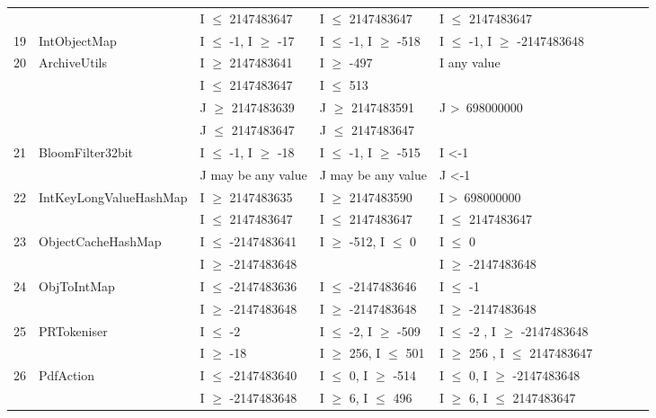 {\begin{longtable}{|l|l|l|l|l|l|l|l|l|}
	&                                             & I $\le$ 2147483647			& I $\le$ 2147483647			& I $\le$ 2147483647					\\	
19	& IntObjectMap				& I $\le$ -1, I $\ge$ -17			& I $\le$ -1, I $\ge$ -518			& I $\le$ -1, I $\ge$ -2147483648\\ 
20	& ArchiveUtils				& I $\ge$ 2147483641			& I $\ge$ -497					& I any value									\\ 
	&							& I $\le$ 2147483647			& I $\le$ 513					& 											\\ 
	&                                             & J $\ge$ 2147483639			& J $\ge$ 2147483591			& J \textgreater~698000000 	   				\\
	&                                             & J $\le$ 2147483647			&  J $\le$ 2147483647			&  	   										\\
21	& BloomFilter32bit 			& I $\le$ -1, I $\ge$ -18			& I $\le$ -1, I $\ge$ -515			& I \textless -1 								\\ 
	&                                             & J may be any value				& J may be any value				& J \textless -1 			   					\\	
22	& IntKeyLongValueHashMap	& I $\ge$ 2147483635			& I $\ge$ 2147483590			& I \textgreater~698000000					\\ 
	&                                             & I $\le$ 2147483647			& I $\le$ 2147483647			& I $\le$ 2147483647					\\	
23	& ObjectCacheHashMap		& I $\le$ -2147483641			& I $\ge$ -512, I $\le$ 0			& I $\le$ 0								\\ 
	&                                             & I $\ge$ -2147483648			& 								& I $\ge$ -2147483648				\\	
24	& ObjToIntMap				& I $\le$ -2147483636			& I $\le$ -2147483646			& I $\le$ -1								\\ 
	&                                             & I $\ge$ -2147483648			& I $\ge$ -2147483648			& I $\ge$ -2147483648			   	\\	
25	& PRTokeniser				& I $\le$ -2						& I $\le$ -2, I $\ge$ -509			& I $\le$ -2 , I $\ge$ -2147483648\\ 
	&                                             & I $\ge$ -18					& I $\ge$ 256, I $\le$ 501		& I $\ge$ 256	, I $\le$ 2147483647\\
26	& PdfAction					& I $\le$ -2147483640 			& I $\le$ 0, I $\ge$ -514			& I $\le$ 0, I $\ge$ -2147483648 	\\ 
	&                                             & I $\ge$ -2147483648			& I $\ge$ 6, I $\le$ 496			& I $\ge$ 6,  I $\le$ 2147483647	\\	

\end{longtable}}
